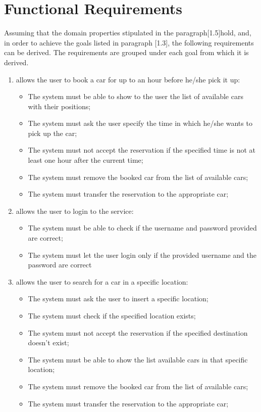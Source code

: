 \section{Functional Requirements}
Assuming that the domain properties stipulated in the paragraph[1.5]hold, and, in order to achieve the goals listed in paragraph [1.3], the following requirements can be derived. The requirements are grouped under each goal from which it is derived.
\begin{enumerate}

\item allows the user to book a car for up to an hour before he/she pick it up:

\begin{itemize}
\item The system must be able to show to the user the list of available cars with their positions;
\item The system must ask the user specify the time in which he/she wants to pick up the car;
\item The system must not accept the reservation if the specified time is not at least one hour after the current time;
\item The system must remove the booked car from the list of available cars;
\item The system must transfer the reservation to the appropriate car;
\end{itemize}

\item allows the user to login to the service:

\begin{itemize}
\item The system must be able to check if the username and password provided are correct;
\item The system must let the user login only if the provided username and the password are correct
\end{itemize}

\item allows the user to search for a car in a specific location:

\begin{itemize}
\item The system must ask the user to insert a specific location;
\item The system must check if the specified location exists;
\item The system must not accept the reservation if the specified destination doesn't exist;
\item The system must be able to show the list available cars in that specific location;
\item The system must remove the booked car from the list of available cars;
\item The system must transfer the reservation to the appropriate car;
\end{itemize}


\end{enumerate}
